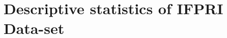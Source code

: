\documentclass[12pt,letterpaper]{article}
\newcommand{\0}{\ensuremath{\mbox{\boldmath $0$}}}
\begin{document}


\pagebreak

\section{Descriptive statistics of IFPRI Data-set\label{app_a3}}
\end{document}
